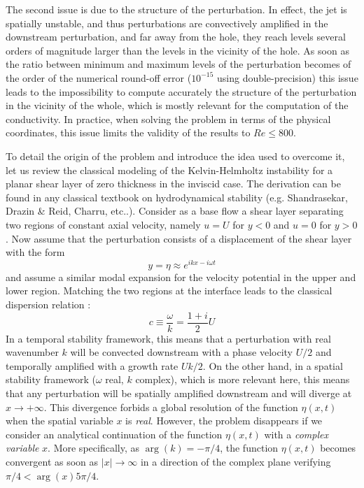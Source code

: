 \documentclass{jfm}
\newcommand\be{\begin{equation}}
\newcommand\ee{\end{equation}}
\begin{document}
The second issue is due to the structure of the perturbation. In effect, the jet is spatially unstable, and thus perturbations are convectively amplified in the downstream perturbation, and far away from the hole, they reach levels several orders of magnitude larger than the levels in the vicinity of the hole. As soon as the ratio between minimum and maximum levels of the perturbation becomes of the order of the numerical round-off error 
($10^{-15}$ using double-precision) this issue leads to the impossibility to compute accurately the structure of the perturbation in the vicinity of the whole, which is mostly relevant for the computation of the conductivity. In practice, when solving the problem in terms of the physical coordinates, this issue limits the validity of the results to $Re \leq 800$.

To detail the origin of the problem and introduce the idea used to overcome it, let us review the classical modeling of the Kelvin-Helmholtz instability for a planar shear layer of zero thickness in the inviscid case. The derivation can be found in any classical textbook on hydrodynamical stability (e.g. Shandrasekar, Drazin \& Reid, Charru, etc..). 
Consider as a base flow a shear layer separating two regions of constant axial velocity, namely $u= U$ for $y<0$ and $u=0$ for $y>0$. Now assume that the perturbation consists of a displacement of the shear layer with the form
\be 
y = \eta \approx e^{i k x - i\omega t} 
\label{eq:etaKH}
\ee
and assume a similar modal expansion for the velocity potential in the upper and lower region. Matching the two regions at the interface leads to the classical dispersion relation :
\be 
c \equiv \frac{\omega}{k} = \frac{1+i}{2} U
\label{eq:cKH}
\ee 
In a temporal stability framework, this means that a perturbation with real wavenumber $k$ will be convected
downstream with a phase velocity $U/2$ and temporally amplified with a growth rate $U k/2$. On the other hand, in a spatial stability framework ($\omega$ real, $k$ complex), which is more relevant here, this means that any perturbation will be spatially amplified downstream and will diverge at $x\rightarrow +\infty$. This divergence forbids a global resolution of the function $\eta(x,t)$ when the spatial variable $x$ is {\em real}. However, the problem disappears if we consider an analytical continuation of the function $\eta(x,t)$ with a {\em complex variable} $x$. More specifically, as $\arg(k) = -\pi/4$, the function $\eta(x,t)$ becomes convergent as soon as $|x| \rightarrow \infty$ in a direction of the complex plane verifying $\pi/4 < \arg(x) 5\pi/4$. 
\end{document}
